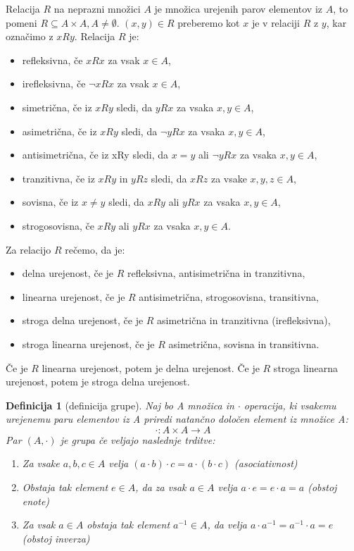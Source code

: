 \documentclass[a4paper, 12pt]{book}
\newtheorem{definicija}{Definicija}[chapter]
\begin{document}
Relacija $R$ na neprazni množici $A$ je množica urejenih parov elementov iz $A$, to pomeni $R\subseteq A\times A, A\neq\emptyset$. $(x, y) \in R$ preberemo kot $x$ je v relaciji $R$ z $y$, kar označimo z $xRy$. Relacija $R$ je:
\begin{itemize}
    \item refleksivna, če $xRx$ za vsak $x\in A$,
    \item irefleksivna, če $\neg xRx$ za vsak $x\in A$,
    \item simetrična, če iz $xRy$ sledi, da $yRx$ za vsaka $x,y\in A$,
    \item asimetrična, če iz $xRy$ sledi, da $\neg yRx$ za vsaka $x,y\in A$,
    \item antisimetrična, če iz xRy sledi, da $x = y$ ali $\neg yRx$ za vsaka $x,y\in A$,
    \item tranzitivna, če iz $xRy$ in $yRz$ sledi, da $xRz$ za vsake $x,y,z\in A$,
    \item sovisna, če iz $x \neq y$ sledi, da $xRy$ ali $yRx$ za vsaka $x,y\in A$,
    \item strogosovisna, če $xRy$ ali $yRx$ za vsaka $x,y\in A$.
\end{itemize}
Za relacijo $R$ rečemo, da je:
\begin{itemize}
    \item delna urejenost, če je $R$ refleksivna, antisimetrična in tranzitivna,
    \item linearna urejenost, če je $R$ antisimetrična, strogosovisna, transitivna,
    \item stroga delna urejenost, če je $R$ asimetrična in tranzitivna (irefleksivna),
    \item stroga linearna urejenost, če je $R$ asimetrična, sovisna in transitivna.
\end{itemize}
Če je $R$ linearna urejenost, potem je delna urejenost. Če je $R$ stroga linearna urejenost, potem je stroga delna urejenost.


\begin{definicija}[definicija grupe]
    Naj bo A množica in $\cdot$ operacija, ki vsakemu urejenemu paru elementov iz A priredi natančno določen element iz množice A:
    \[
        \cdot:A \times A \rightarrow A 
    \]
    Par $(A, \cdot)$ je grupa če veljajo naslednje trditve:
    \begin{enumerate}
        \item Za vsake $a, b, c \in A$ velja $(a \cdot b) \cdot c = a \cdot (b \cdot c)$ (asociativnost)
        \item Obstaja tak element $e \in A$, da za vsak $a \in A$ velja $a \cdot e = e \cdot a = a$ (obstoj enote)
        \item Za vsak $a \in A$ obstaja tak element $a^{-1} \in A$, da velja $a \cdot a^{-1} = a^{-1} \cdot a = e$ (obstoj inverza)
        
    \end{enumerate}
\end{definicija}
\end{document}
